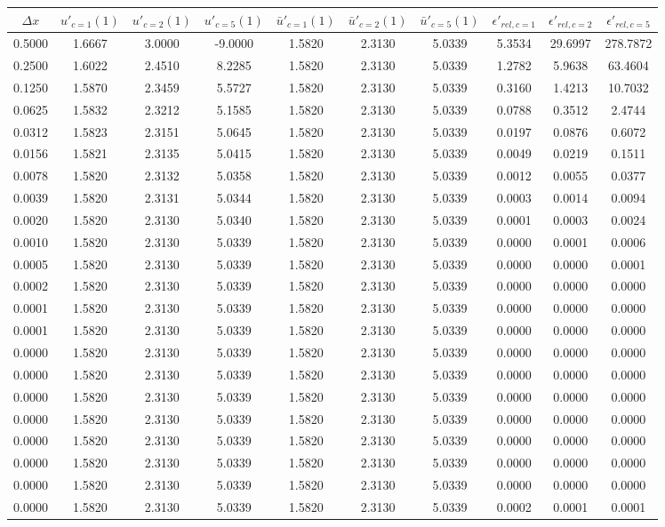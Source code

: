 \begin{tabular}{|c|c|c|c|c|c|c|c|c|c|}
\hline
\textbf{$\Delta x$}&\textbf{$u'_{c=1}(1)$}&\textbf{$u'_{c=2}(1)$}&\textbf{$u'_{c=5}(1)$}&\textbf{$\bar{u}'_{c=1}(1)$}&\textbf{$\bar{u}'_{c=2}(1)$}&\textbf{$\bar{u}'_{c=5}(1)$}&\textbf{$\epsilon'_{rel,c=1}$}&\textbf{$\epsilon'_{rel,c=2}$}&\textbf{$\epsilon'_{rel,c=5}$}\\\hline
0.5000&1.6667&3.0000&-9.0000&1.5820&2.3130&5.0339&5.3534&29.6997&278.7872\\\hline
0.2500&1.6022&2.4510&8.2285&1.5820&2.3130&5.0339&1.2782&5.9638&63.4604\\\hline
0.1250&1.5870&2.3459&5.5727&1.5820&2.3130&5.0339&0.3160&1.4213&10.7032\\\hline
0.0625&1.5832&2.3212&5.1585&1.5820&2.3130&5.0339&0.0788&0.3512&2.4744\\\hline
0.0312&1.5823&2.3151&5.0645&1.5820&2.3130&5.0339&0.0197&0.0876&0.6072\\\hline
0.0156&1.5821&2.3135&5.0415&1.5820&2.3130&5.0339&0.0049&0.0219&0.1511\\\hline
0.0078&1.5820&2.3132&5.0358&1.5820&2.3130&5.0339&0.0012&0.0055&0.0377\\\hline
0.0039&1.5820&2.3131&5.0344&1.5820&2.3130&5.0339&0.0003&0.0014&0.0094\\\hline
0.0020&1.5820&2.3130&5.0340&1.5820&2.3130&5.0339&0.0001&0.0003&0.0024\\\hline
0.0010&1.5820&2.3130&5.0339&1.5820&2.3130&5.0339&0.0000&0.0001&0.0006\\\hline
0.0005&1.5820&2.3130&5.0339&1.5820&2.3130&5.0339&0.0000&0.0000&0.0001\\\hline
0.0002&1.5820&2.3130&5.0339&1.5820&2.3130&5.0339&0.0000&0.0000&0.0000\\\hline
0.0001&1.5820&2.3130&5.0339&1.5820&2.3130&5.0339&0.0000&0.0000&0.0000\\\hline
0.0001&1.5820&2.3130&5.0339&1.5820&2.3130&5.0339&0.0000&0.0000&0.0000\\\hline
0.0000&1.5820&2.3130&5.0339&1.5820&2.3130&5.0339&0.0000&0.0000&0.0000\\\hline
0.0000&1.5820&2.3130&5.0339&1.5820&2.3130&5.0339&0.0000&0.0000&0.0000\\\hline
0.0000&1.5820&2.3130&5.0339&1.5820&2.3130&5.0339&0.0000&0.0000&0.0000\\\hline
0.0000&1.5820&2.3130&5.0339&1.5820&2.3130&5.0339&0.0000&0.0000&0.0000\\\hline
0.0000&1.5820&2.3130&5.0339&1.5820&2.3130&5.0339&0.0000&0.0000&0.0000\\\hline
0.0000&1.5820&2.3130&5.0339&1.5820&2.3130&5.0339&0.0000&0.0000&0.0000\\\hline
0.0000&1.5820&2.3130&5.0339&1.5820&2.3130&5.0339&0.0000&0.0000&0.0000\\\hline
0.0000&1.5820&2.3130&5.0339&1.5820&2.3130&5.0339&0.0002&0.0001&0.0001\\\hline
\end{tabular}
